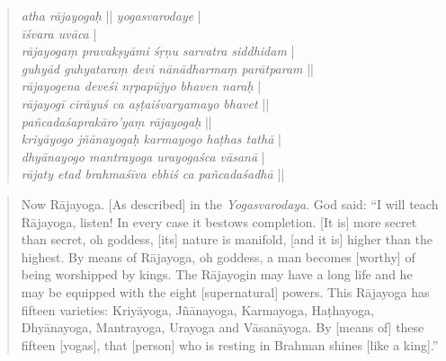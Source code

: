 \begin{quote}
\textit{atha rājayogaḥ} || \textit{yogasvarodaye} |\\
\textit{īśvara uvāca} |\\
\textit{rājayogaṃ pravakṣyāmi śṛṇu sarvatra siddhidam} |\\
\textit{guhyād guhyataraṃ devi nānādharmaṃ parātparam} ||\\
\textit{rājayogena deveśi nṛpapūjyo bhaven naraḥ} |\\
\textit{rājayogī cirāyuś ca aṣṭaiśvaryamayo bhavet} ||\\
\textit{pañcadaśaprakāro'yaṃ rājayogaḥ} ||\\
\textit{kriyāyogo jñānayogaḥ karmayogo haṭhas tathā} |\\
\textit{dhyānayogo mantrayoga urayogaśca vāsanā} |\\
\textit{rājaty etad brahmaśīva ebhiś ca pañcadaśadhā} ||\\
\end{quote}

\begin{quote}
Now Rājayoga. [As described] in the \emph{Yogasvarodaya}.
God said:
``I will teach Rājayoga, listen! In every case it bestows completion.
[It is] more secret than secret, oh goddess, [its] nature is manifold, [and it is] higher than the highest. 
By means of Rājayoga, oh goddess, a man becomes [worthy] of being worshipped by kings.
The Rājayogin may have a long life and he may be equipped with the eight [supernatural] powers.
This Rājayoga has fifteen varieties: Kriyāyoga, Jñānayoga, Karmayoga, Haṭhayoga,
Dhyānayoga, Mantrayoga, Urayoga and Vāsanāyoga.
By [means of] these fifteen [yogas], that [person] who is resting in Brahman shines [like a king].''
\end{quote}

